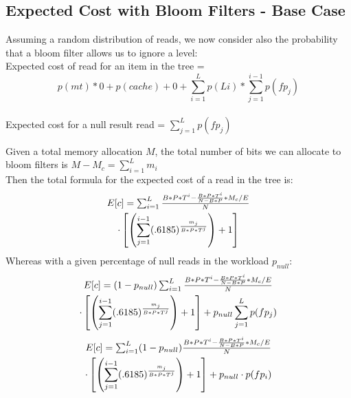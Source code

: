 \documentclass{sig-alternate-05-2015}
\begin{document}
\subsection{Expected Cost with Bloom Filters - Base Case}

Assuming a random distribution of reads, we now consider also the probability that a bloom filter allows us to ignore a level: \\
Expected cost of read for an item in the tree = $$p(mt) * 0  + p(cache) + 0 + \sum_{i=1}^L p(Li) * \sum_{j=1}^{i-1} p(fp_j)$$ \\
Expected cost for a null result read = $\sum_{j=1}^{L} p(fp_j)$

Given a total memory allocation $M$, the total number of bits we can allocate to bloom filters is $M-M_c = \sum_{i=1}^L m_i$ \\
Then the total formula for the expected cost of a read in the tree is: 
\begin{multline}
$$E[c] = \sum_{i=1}^{L} \frac{B*P*T^i - \frac{B*P*T^i}{N-B*P} * M_c/E}{N} \\ \cdot \left[ \left(\sum_{j=1}^{i-1} (.6185) ^  {\frac{m_j}{B*P*T^j}}\right) +1 \right]$$ 
\end{multline}
Whereas with a given percentage of null reads in the workload $p_{null}$:
\begin{multline}
$$E[c] = (1-p_{null})\sum_{i=1}^{L} \frac{B*P*T^i - \frac{B*P*T^i}{N-B*P} * M_c/E}{N} \\ \cdot \left[ \left(\sum_{j=1}^{i-1} (.6185) ^  {\frac{m_j}{B*P*T^j}}\right) +1 \right] + p_{null}\sum_{j=1}^{L} p(fp_j)$$
\end{multline}
\begin{multline}
$$E[c] = \sum_{i=1}^{L} (1-p_{null})\frac{B*P*T^i - \frac{B*P*T^i}{N-B*P} * M_c/E}{N} \\ \cdot \left[ \left(\sum_{j=1}^{i-1} (.6185) ^  {\frac{m_j}{B*P*T^j}}\right) +1 \right] + p_{null} \cdot p(fp_i) $$
\end{multline}
\end{document}

